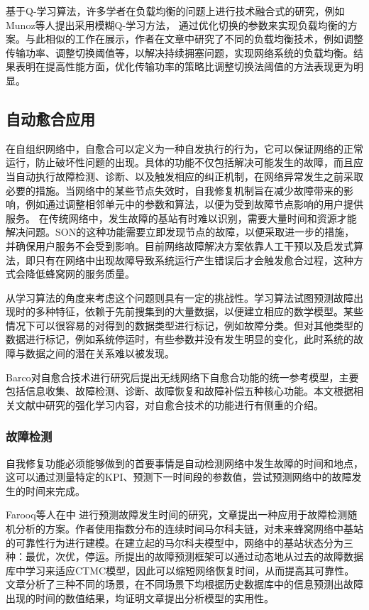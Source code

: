 \documentclass{IEEEtran}
\begin{document}
基于Q-学习算法，许多学者在负载均衡的问题上进行技术融合式的研究，例如Munoz等人\cite{Munoz2011}提出采用模糊Q-学习方法， 通过优化切换的参数来实现负载均衡的方案。与此相似的工作在\cite{Munoz2013}展示，作者在文章中研究了不同的负载均衡技术，例如调整传输功率、调整切换阈值等，以解决持续拥塞问题，实现网络系统的负载均衡。结果表明在提高性能方面，优化传输功率的策略比调整切换法阈值的方法表现更为明显。


\subsection{自动愈合应用}

在自组织网络中，自愈合可以定义为一种自发执行的行为，它可以保证网络的正常运行，防止破坏性问题的出现。具体的功能不仅包括解决可能发生的故障，而且应当自动执行故障检测、诊断、以及触发相应的纠正机制，在网络异常发生之前采取必要的措施。当网络中的某些节点失效时，自我修复机制旨在减少故障带来的影响，例如通过调整相邻单元中的参数和算法，以便为受到故障节点影响的用户提供服务。 在传统网络中，发生故障的基站有时难以识别，需要大量时间和资源才能解决问题。SON的这种功能需要立即发现节点的故障，以便采取进一步的措施，并确保用户服务不会受到影响。目前网络故障解决方案依靠人工干预以及启发式算法，即只有在网络中出现故障导致系统运行产生错误后才会触发愈合过程，这种方式会降低蜂窝网的服务质量。

从学习算法的角度来考虑这个问题则具有一定的挑战性。学习算法试图预测故障出现时的多种特征，依赖于先前搜集到的大量数据，以便建立相应的数学模型。某些情况下可以很容易的对得到的数据类型进行标记，例如故障分类。但对其他类型的数据进行标记，例如系统停运时，有些参数并没有发生明显的变化，此时系统的故障与数据之间的潜在关系难以被发现。

Barco\cite{Barco2012}对自愈合技术进行研究后提出无线网络下自愈合功能的统一参考模型，主要包括信息收集、故障检测、诊断、故障恢复和故障补偿五种核心功能。本文根据相关文献中研究的强化学习内容，对自愈合技术的功能进行有侧重的介绍。

\subsubsection{故障检测}
自我修复功能必须能够做到的首要事情是自动检测网络中发生故障的时间和地点，这可以通过测量特定的KPI、预测下一时间段的参数值，尝试预测网络中的故障发生的时间来完成。

Farooq等人在\cite{Farooq2015}中 进行预测故障发生时间的研究，文章提出一种应用于故障检测随机分析的方案。作者使用指数分布的连续时间马尔科夫链，对未来蜂窝网络中基站的可靠性行为进行建模。在建立起的马尔科夫模型中，网络中的基站状态分为三种：最优，次优，停运。所提出的故障预测框架可以通过动态地从过去的故障数据库中学习来适应CTMC模型，因此可以缩短网络恢复时间，从而提高其可靠性。文章分析了三种不同的场景，在不同场景下均根据历史数据库中的信息预测出故障出现的时间的数值结果，均证明文章提出分析模型的实用性。
\end{document}
